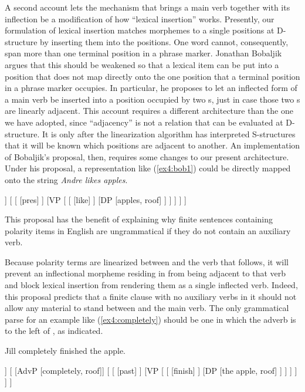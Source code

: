 A second account lets the mechanism that brings a main verb together with its inflection be a modification of how ``lexical insertion'' works. Pre\-sent\-ly, our formulation of lexical insertion matches morphemes to a single  positions at D-structure by inserting them into the  positions. One word cannot, consequently, span more than one terminal position in a phrase marker. Jonathan Bobaljik\cite{Bobaljik:1994a,Bobaljik:1995a} argues that this should be weakened so that a lexical item can be put into a position that does not map directly onto the one position that a terminal position in a phrase marker occupies. In particular, he proposes to let an inflected form of a main verb be inserted into a position occupied by two s, just in case those two s are linearly adjacent. This account requires a different architecture than the one we have adopted, since ``adjacency'' is not a relation that can be evaluated at D-structure. It is only after the linearization algorithm has interpreted S-structures that it will be known which positions are adjacent to another. An implementation of Bobaljik's proposal, then, requires some changes to our present architecture. Under his proposal, a representation like (\ref{ex4:bob1}) could be directly mapped onto the string \emph{Andre likes apples}.
\begin{exe}
\ex \label{ex4:bob1} 
\small
\begin{forest}
[IP
	[DP [Andre, roof]]
	[ 
		[ [pres] ]
		[VP [
			[ [like] ]
			[DP [apples, roof] ]
		] ]
	]
]
\end{forest}
\end{exe}
This proposal has the benefit of explaining why finite sentences containing polarity items in English are ungrammatical if they do not contain an auxiliary verb.
\begin{exe}
\ex \label{ex4:notfin} 
\begin{xlist}
\end{xlist}
\end{exe}
Because polarity terms are linearized between  and the verb that follows, it will prevent an inflectional morpheme residing in  from being adjacent to that verb and block lexical insertion from rendering them as a single inflected verb. Indeed, this proposal predicts that a finite clause with no auxiliary verbs in it should not allow any material to stand between  and the main verb. The only grammatical parse for an example like (\ref{ex4:completely})  should be one in which the adverb is to the left of , as indicated.
\begin{exe}
\ex \label{ex4:completely} Jill completely finished the apple.
\sn
\small
\begin{forest}
[IP
	[DP [Jill, roof]]
	[ 
		[AdvP [completely, roof]]
		[
			[ [past] ]
			[VP [ 
				[ [finish] ]
				[DP [the apple, roof] ]
			] ]
		 ]
	]
]
\end{forest}
\end{exe}

